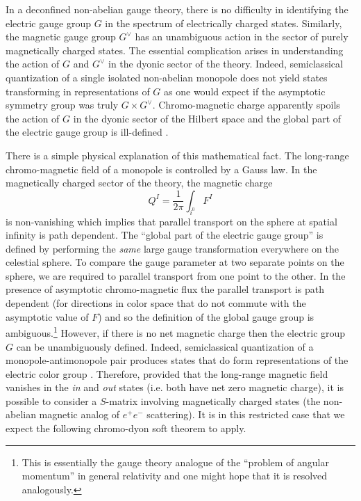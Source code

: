 \documentclass[11pt]{article}
\begin{document}
In a deconfined non-abelian gauge theory, there is no difficulty in identifying the electric gauge group $G$ in the spectrum of electrically charged states. Similarly, the magnetic gauge group $G^\vee$ has an unambiguous action in the sector of purely magnetically charged states. The essential complication arises in understanding the action of $G$ and $G^\vee$ in the dyonic sector of the theory. Indeed, semiclassical quantization of a single isolated non-abelian monopole does not yield states transforming in representations of $G$ \cite{Abouelsaood:1982dz,Nelson:1983em} as one would expect if the asymptotic symmetry group was truly $G\times G^\vee$. Chromo-magnetic charge apparently spoils the action of $G$ in the dyonic sector of the Hilbert space and the global part of the electric gauge group is ill-defined \cite{ Balachandran:1982gt, Nelson:1983bu, Balachandran:1983xz, Balachandran:1983fg, Nelson:1983fn}.

There is a simple physical explanation of this mathematical fact. The long-range chromo-magnetic field of a monopole is controlled by a Gauss law. In the magnetically charged sector of the theory, the magnetic charge 
\begin{equation}
Q^I=\frac{1}{2\pi}\int_{i^0} F^I
\end{equation}
is non-vanishing which implies that parallel transport on the sphere at spatial infinity is path dependent. The ``global part of the electric gauge group'' is defined by performing the \emph{same} large gauge transformation everywhere on the celestial sphere. 
To compare the gauge parameter at two separate points on the sphere, we are required to parallel transport from one point to the other. In the presence of asymptotic chromo-magnetic flux the parallel transport is path dependent (for directions in color space that do not commute with the asymptotic value of $F$) and so the definition of the global gauge group is ambiguous.\footnote{This is essentially the gauge theory analogue of the ``problem of angular momentum'' in general relativity and one might hope that it is resolved analogously.}  However, if there is no net magnetic charge then the electric group $G$ can be unambiguously defined. Indeed, semiclassical quantization of a monopole-antimonopole pair produces states that do form representations of the electric color group \cite{Nelson:1983fn}. Therefore, provided that the long-range magnetic field vanishes in the \emph{in} and \emph{out} states (i.e. both have net zero magnetic charge), it is possible to consider a $S$-matrix involving magnetically charged states (the non-abelian magnetic analog of $e^+e^-$ scattering). It is in this restricted case that we expect the following chromo-dyon soft theorem to apply. 
\end{document}
